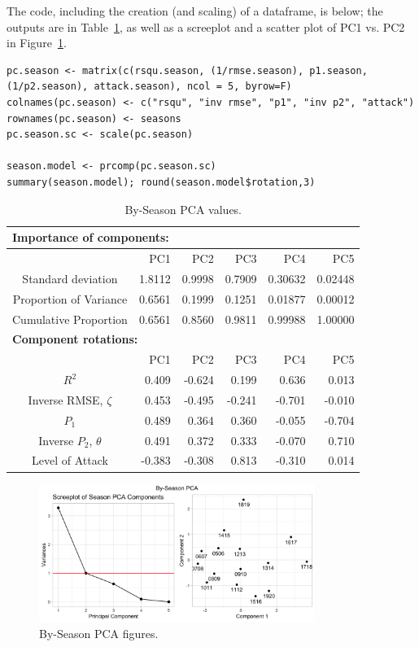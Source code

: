 \documentclass[a4paper,10pt]{report}
\begin{document}
The code, including the creation (and scaling) of a dataframe, is below; the outputs are in Table~\ref{tab:pcaseason}, as well as a screeplot and a scatter plot of PC1 vs. PC2 in Figure~\ref{FIG:01_07b_seasonpca}.

\begin{lstlisting}
pc.season <- matrix(c(rsqu.season, (1/rmse.season), p1.season, (1/p2.season), attack.season), ncol = 5, byrow=F)
colnames(pc.season) <- c("rsqu", "inv rmse", "p1", "inv p2", "attack")
rownames(pc.season) <- seasons
pc.season.sc <- scale(pc.season)

season.model <- prcomp(pc.season.sc)
summary(season.model); round(season.model$rotation,3)
\end{lstlisting}

\begin{table}[h!]\begin{center}\begin{tabular}{c|rrrrr}
\multicolumn{6}{l}{\textbf{Importance of components:}} \\ \hline
					&PC1&    PC2&    PC3&     PC4&     PC5\\\hline
Standard deviation    & 1.8112& 0.9998& 0.7909& 0.30632& 0.02448\\
Proportion of Variance&0.6561 &0.1999& 0.1251& 0.01877& 0.00012\\
Cumulative Proportion & 0.6561 &0.8560& 0.9811& 0.99988& 1.00000\\ \hline \hline
\multicolumn{6}{l}{\textbf{Component rotations:}} \\ \hline 
&PC1    &    PC2     &   PC3   &      PC4      &    PC5\\\hline
$R^2$      &0.409& -0.624&  0.199&  0.636&  0.013\\
Inverse RMSE, $\zeta$  &0.453& -0.495& -0.241& -0.701& -0.010\\
$P_1$        &0.489&  0.364&  0.360& -0.055& -0.704\\
Inverse $P_2$, $\theta$    &0.491&  0.372&  0.333& -0.070&  0.710\\
Level of Attack   &-0.383& -0.308&  0.813& -0.310&  0.014\\
\end{tabular}\end{center}\caption{By-Season PCA values.}\label{tab:pcaseason}\end{table}

\begin{figure}[h!]\begin{center}
	\includegraphics[width=0.8\textwidth]{elite_07b_seasonpca.png}
	\caption{By-Season PCA figures.}\label{FIG:01_07b_seasonpca}
\end{center}\end{figure}
\end{document}
